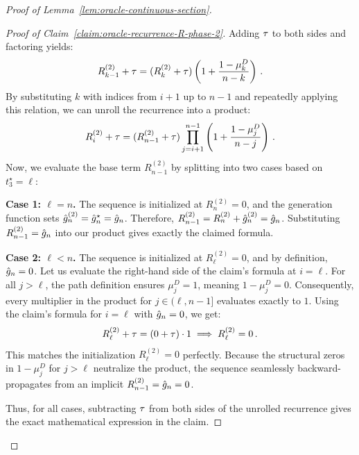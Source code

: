 \begin{proof}[Proof of Lemma~\ref{lem:oracle-continuous-section}]
\begin{proof}[Proof of Claim~\ref{claim:oracle-recurrence-R-phase-2}]
        Adding $\tau$ to both sides and factoring yields:
        \begin{equation*}
            R_{k-1}^{(2)} + \tau = (R_k^{(2)} + \tau) \left( 1 + \frac{1 - \mu_k^D}{n - k} \right)\,.
        \end{equation*}
        By substituting $k$ with indices from $i+1$ up to $n-1$ and repeatedly applying this relation, we can unroll the recurrence into a product:
        \begin{equation*}
            R_{i}^{(2)} + \tau = (R_{n-1}^{(2)} + \tau) \prod_{j=i+1}^{n-1} \left( 1 + \frac{1 - \mu_j^D}{n - j} \right)\,.
        \end{equation*}
        Now, we evaluate the base term $R_{n-1}^{(2)}$ by splitting into two cases based on $t_3^\star = \ell$:
        
        \textbf{Case 1: $\ell = n$.} The sequence is initialized at $R_n^{(2)} = 0$, and the generation function sets $\hat{g}_n^{(2)} = \hat{g}_n^\star = \hat{g}_n$. Therefore, $R_{n-1}^{(2)} = R_n^{(2)} + \hat{g}_n^{(2)} = \hat{g}_n$. Substituting $R_{n-1}^{(2)} = \hat{g}_n$ into our product gives exactly the claimed formula.
        
        \textbf{Case 2: $\ell < n$.} The sequence is initialized at $R_\ell^{(2)} = 0$, and by definition, $\hat{g}_n = 0$. Let us evaluate the right-hand side of the claim's formula at $i = \ell$. For all $j > \ell$, the path definition ensures $\mu_j^D = 1$, meaning $1 - \mu_j^D = 0$. Consequently, every multiplier in the product for $j \in (\ell, n-1]$ evaluates exactly to $1$. Using the claim's formula for $i=\ell$ with $\hat{g}_n=0$, we get:
        \begin{equation*}
            R_\ell^{(2)} + \tau = (0 + \tau) \cdot 1 \implies R_\ell^{(2)} = 0\,.
        \end{equation*}
        This matches the initialization $R_\ell^{(2)} = 0$ perfectly. Because the structural zeros in $1-\mu_j^D$ for $j > \ell$ neutralize the product, the sequence seamlessly backward-propagates from an implicit $R_{n-1}^{(2)} = \hat{g}_n = 0$. 
        
        Thus, for all cases, subtracting $\tau$ from both sides of the unrolled recurrence gives the exact mathematical expression in the claim.
    \end{proof}


\end{proof}
